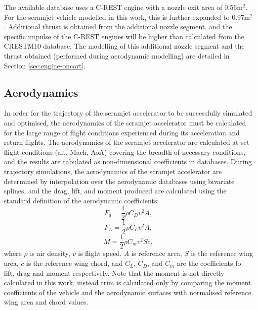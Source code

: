 The available database uses a C-REST engine with a nozzle exit area of 0.56m$^2$. For the scramjet vehicle modelled in this work, this is further expanded to 0.97m$^2$. Additional thrust is obtained from the additional nozzle segment, and the specific impulse of the C-REST engines will be higher than calculated from the \textsf{CRESTM10} database. The modelling of this additional nozzle segment and the thrust obtained (performed during aerodynamic modelling) are detailed in Section \ref{sec:engine-oncart}.






		
		
		\subsection{Aerodynamics}\label{sec:aero}
		
		
		
In order for the trajectory of the scramjet accelerator to be successfully simulated and optimised, the aerodynamics of the scramjet accelerator must be calculated for the large range of flight conditions experienced during its acceleration and return flights. 
The aerodynamics of the scramjet accelerator are calculated at set flight conditions (alt, Mach, AoA) covering the breadth of necessary conditions, and the results are tabulated as non-dimensional coefficients in databases. During trajectory simulations, the aerodynamics of the scramjet accelerator are determined by interpolation over the aerodynamic databases using bivariate splines, and the drag, lift, and moment produced are calculated using the standard definition of the aerodynamic coefficients:
\begin{equation}
F_d = \frac{1}{2}\rho C_D v^2 A ,
\end{equation}
\begin{equation}
F_L = \frac{1}{2}\rho C_L v^2 A ,
\end{equation}
\begin{equation}
M = \frac{1}{2}\rho C_m v^2 S c ,
\end{equation}
where $\rho$ is air density, $v$ is flight speed, $A$ is reference area, $S$ is the reference wing area, $c$ is the reference wing chord, and $C_L$, $C_D$, and $C_m$ are the coefficients fo lift, drag and moment respectively. Note that the moment is not directly calculated in this work, instead trim is calculated only by comparing the moment coefficients of the vehicle and the aerodynamic surfaces with normalised reference wing area and chord values. 


